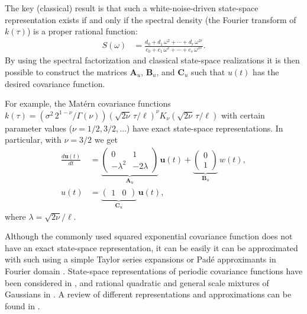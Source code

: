 \documentclass[journal]{IEEEtran}
\begin{document}
The key (classical) result is that such a white-noise-driven state-space representation exists if and only if the spectral density (the Fourier transform of $k(\tau)$) is a proper rational function:
%
\begin{equation}
\begin{split}
  S(\omega) &= \frac{d_0 + d_1 \, \omega^2 + \cdots + d_r \, \omega^{2r}}{c_0 + c_1 \, \omega^2 + \cdots + c_s \, \omega^{2s}}.
\end{split}
\end{equation}
%
By using the spectral factorization and classical state-space realizations \cite{Sarkka+Solin+Hartikainen:2013} it is then possible to construct the matrices $\mathbf{A}_u$, $\mathbf{B}_u$, and $\mathbf{C}_u$ such that $u(t)$ has the desired covariance function. 

For example, the Mat\'ern covariance functions  $k(\tau) = \left( \sigma^2 \, 2^{1-\nu} / \Gamma(\nu)\right) \left(\sqrt{2\nu}\,\tau / \ell \right)^\nu K_\nu\left(\sqrt{2\nu}\,\tau / \ell \right)$ with certain parameter values ($\nu=1/2,3/2,\ldots$) have exact state-space representations. In particular, with $\nu=3/2$ we get
\begin{equation}
\begin{split}
\frac{d\mathbf{u}(t)}{dt} &= \underbrace{\begin{pmatrix} 0 & 1 \\ -\lambda^2 & -2\lambda \end{pmatrix}}_{\mathbf{A}_u}
 \, \mathbf{u}(t)
+ \underbrace{\begin{pmatrix} 0 \\ 1 \end{pmatrix}}_{\mathbf{B}_u} \, w(t), \\
   u(t) &= \underbrace{\begin{pmatrix} 1 & 0 \end{pmatrix}}_{\mathbf{C}_u} \, \mathbf{u}(t),
\end{split}
\end{equation}
%
where $\lambda=\sqrt{2\nu}/\ell$. 

Although the commonly used squared exponential covariance function does not have an exact state-space representation, it can be easily it can be approximated with such using a simple Taylor series expansions or Pad\'e approximants in Fourier domain \cite{Sarkka+Piche:2014,Karvonen+Sarkka:2016}. State-space representations of periodic covariance functions have been considered in \cite{Solin+Sarkka:2014a}, and rational quadratic and general scale mixtures of Gaussians in \cite{Solin+Sarkka:2014b}. A review of different representations and approximations can be found in \cite{Solin:2016}.
\end{document}
